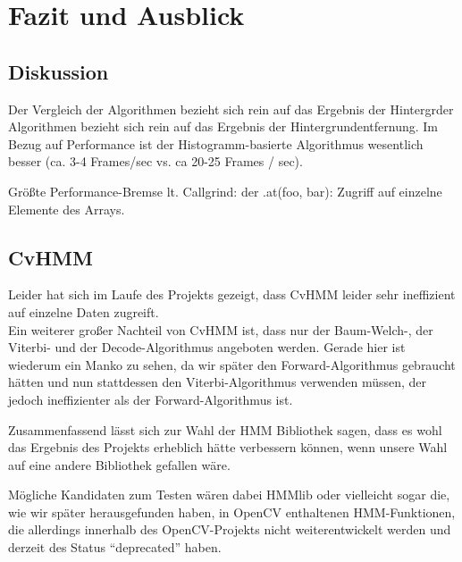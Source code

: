 \section{Fazit und Ausblick}
\label{chap:fazit}
\subsection{Diskussion}
\label{sec:diskuss}

Der Vergleich der Algorithmen bezieht sich rein auf das Ergebnis der Hintergrder Algorithmen bezieht sich rein auf das Ergebnis der Hintergrundentfernung.
Im Bezug auf Performance ist der Histogramm-basierte Algorithmus wesentlich besser (ca. 3-4 Frames/sec vs. ca 20-25 Frames / sec).

Größte Performance-Bremse lt. Callgrind: der .at(foo, bar): Zugriff auf einzelne Elemente des Arrays.

\subsection{CvHMM}
\label{sec:CvHMM}
Leider hat sich im Laufe des Projekts gezeigt, dass CvHMM leider sehr ineffizient auf einzelne Daten zugreift.\\

Ein weiterer großer Nachteil von CvHMM ist, dass nur der Baum-Welch-, der Viterbi- und der Decode-Algorithmus angeboten werden.
 Gerade hier ist wiederum ein Manko zu sehen, da wir später den Forward-Algorithmus gebraucht hätten und nun stattdessen den Viterbi-Algorithmus verwenden müssen, der jedoch ineffizienter als der Forward-Algorithmus ist.

Zusammenfassend lässt sich zur Wahl der HMM Bibliothek sagen, dass es wohl das Ergebnis des Projekts erheblich hätte verbessern können, wenn unsere Wahl auf eine andere Bibliothek gefallen wäre.

Mögliche Kandidaten zum Testen wären dabei HMMlib oder vielleicht sogar die, wie wir später herausgefunden haben, in OpenCV enthaltenen HMM-Funktionen, die allerdings innerhalb des OpenCV-Projekts nicht weiterentwickelt werden und derzeit des Status “deprecated” haben.


